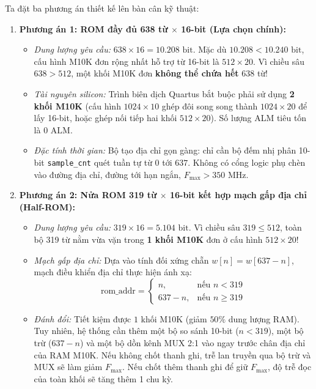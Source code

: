 Ta đặt ba phương án thiết kế lên bàn cân kỹ thuật:
\begin{enumerate}[leftmargin=1.5em, itemsep=3pt]
    \item \textbf{Phương án 1: ROM đầy đủ 638 từ $\times$ 16-bit (Lựa chọn chính):}
    \begin{itemize}[leftmargin=1.5em, itemsep=1pt]
        \item \emph{Dung lượng yêu cầu:} $638 \times 16 = 10.208\text{ bit}$. Mặc dù $10.208 < 10.240\text{ bit}$, cấu hình M10K đơn rộng nhất hỗ trợ từ 16-bit là $512 \times 20$. Vì chiều sâu $638 > 512$, một khối M10K đơn \textbf{không thể chứa hết} 638 từ!
        \item \emph{Tài nguyên silicon:} Trình biên dịch Quartus bắt buộc phải sử dụng \textbf{2 khối M10K} (cấu hình $1024 \times 10$ ghép đôi song song thành $1024 \times 20$ để lấy 16-bit, hoặc ghép nối tiếp hai khối $512 \times 20$). Số lượng ALM tiêu tốn là $0\text{ ALM}$.
        \item \emph{Đặc tính thời gian:} Bộ tạo địa chỉ gọn gàng: chỉ cần bộ đếm nhị phân 10-bit
        \texttt{sample\_cnt} quét tuần tự từ $0$ tới $637$. Không có cổng logic phụ chèn vào đường địa chỉ, đường tới hạn ngắn, $F_{\max} > 350\text{ MHz}$.
    \end{itemize}

    \item \textbf{Phương án 2: Nửa ROM 319 từ $\times$ 16-bit kết hợp mạch gấp địa chỉ (Half-ROM):}
    \begin{itemize}[leftmargin=1.5em, itemsep=1pt]
        \item \emph{Dung lượng yêu cầu:} $319 \times 16 = 5.104\text{ bit}$. Vì chiều sâu $319 \le 512$, toàn bộ 319 từ nằm vừa vặn trong \textbf{1 khối M10K} đơn ở cấu hình $512 \times 20$!
        \item \emph{Mạch gấp địa chỉ:} Dựa vào tính đối xứng chẵn $w[n] = w[637 - n]$, mạch điều khiển địa chỉ thực hiện ánh xạ:
        \begin{equation}
        \text{rom\_addr} = \begin{cases} n, & \text{nếu } n < 319 \\ 637 - n, & \text{nếu } n \ge 319 \end{cases}
        \end{equation}
        \item \emph{Đánh đổi:} Tiết kiệm được $1$ khối M10K (giảm $50\%$ dung lượng RAM). Tuy nhiên, hệ thống cần thêm một bộ so sánh 10-bit ($n < 319$), một bộ trừ ($637 - n$) và một bộ dồn kênh MUX 2:1 vào ngay trước chân địa chỉ của RAM M10K. Nếu không chốt thanh ghi, trễ lan truyền qua bộ trừ và MUX sẽ làm giảm $F_{\max}$. Nếu chốt thêm thanh ghi để giữ $F_{\max}$, độ trễ đọc của toàn khối sẽ tăng thêm 1 chu kỳ.
    \end{itemize}


\end{enumerate}
